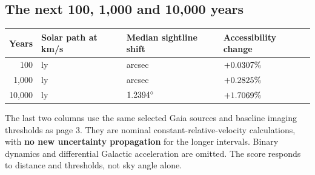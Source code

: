 \subsection*{The next 100, 1,000 and 10,000 years}
\begin{tabularx}{\linewidth}{@{}rXXX@{}}\toprule
Years & Solar path at \ReportSolarSpeed{} km/s & Median sightline shift & Accessibility change\\\midrule
100 & \ReportCenturyTablePath{} ly & \ReportCenturyTableSightline{} arcsec & $+0.0307\%$\\
1,000 & \ReportMillenniumTablePath{} ly & \ReportMillenniumTableSightline{} arcsec & $+0.2825\%$\\
10,000 & \ReportTenMillenniaTablePath{} ly & $1.2394^\circ$ & $+1.7069\%$\\\bottomrule
\end{tabularx}\par\vspace{7pt}
The last two columns use the same selected \ReportSampleSize{} Gaia sources and baseline imaging thresholds as page 3. They are nominal constant-relative-velocity calculations, with \textbf{no new uncertainty propagation} for the longer intervals. Binary dynamics and differential Galactic acceleration are omitted. The score responds to distance and thresholds, not sky angle alone.

